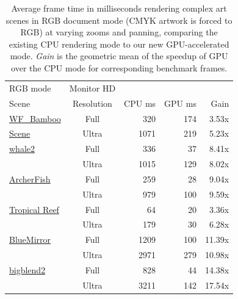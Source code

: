 \begin{table}
    \begin{tabular}{| l | c || r | r | r |}
    \hline
RGB mode & Monitor HD    &        &        & \\
Scene & Resolution & CPU ms & GPU ms & Gain \\ \hline \hline

\hyperref[fig:bamboo]{WF\_Bamboo}	&	Full 	&  320	&	174	&	3.53x \\ %
\hspace{0.3em} \hyperref[fig:bamboo]{Scene}	&	Ultra	&1071	&	219	&	5.23x	\\ \hline


\hyperref[fig:whale]{whale2}	&	Full &336	&	37	&	8.41x	\\  %
	&	Ultra	&1015	&	129	&	8.02x	\\ \hline

\hyperref[fig:archerfish]{ArcherFish}	&	Full 	&259	&	28	&	9.04x	\\ %
	&	Ultra	&979	&	100	&	9.59x	\\ \hline


\hyperref[fig:reef]{Tropical Reef}	&	Full 	&64	&	20	&	3.36x	\\  %
	&	Ultra	&179	&	30	&	6.28x	\\ \hline

\hyperref[fig:blue-mirror]{BlueMirror}	&	Full &1209	&	100	&	11.39x	\\  %
	&	Ultra	&2971	&	279	&	10.98x	\\ \hline


\hyperref[fig:big-blend]{bigblend2} 	&	Full 	&828	&	44	&	14.38x	\\  %
	&	Ultra	&3211	&	142	&	17.54x	\\ \hline

    \hline
    \end{tabular}

\caption{Average frame time in milliseconds rendering complex art
scenes in RGB document mode (CMYK artwork is forced to RGB) at varying
zooms and panning, comparing the existing CPU rendering mode to our new
GPU-accelerated mode.  {\em Gain} is the geometric mean of the speedup
of GPU over the CPU mode for corresponding benchmark frames.
}
\label{table:rgb-scene-performance}

\end{table}

